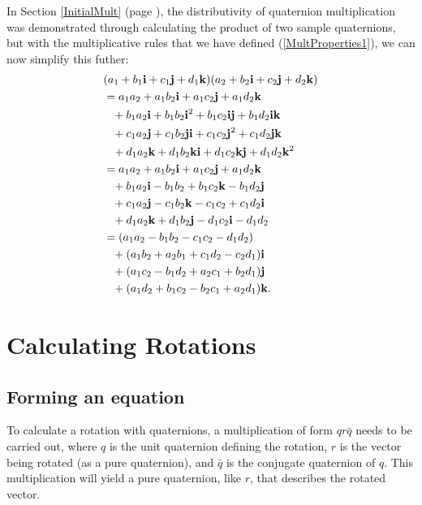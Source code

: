 \documentclass[11pt]{article}
\begin{document}
In Section \ref{InitialMult} (page \pageref{InitialMult}), the distributivity of quaternion multiplication was demonstrated through calculating the product of two sample quaternions, but with the multiplicative rules that we have defined (\ref{MultProperties1}), we can now simplify this futher:
\begin{equation}
    \begin{aligned}
        & (a_1 + b_1\vb{i} + c_1\vb{j} + d_1\vb{k})(a_2 + b_2\vb{i} + c_2\vb{j} + d_2\vb{k}) \\
        & = a_1a_2 + a_1b_2\vb{i} + a_1c_2\vb{j} + a_1d_2\vb{k} \\
        & \phantom{=} + b_1a_2\vb{i} + b_1b_2\vb{i}^2 + b_1c_2\vb{i}\vb{j} + b_1d_2\vb{i}\vb{k} \\
        & \phantom{=} + c_1a_2\vb{j} + c_1b_2\vb{j}\vb{i} + c_1c_2\vb{j}^2 + c_1d_2\vb{j}\vb{k} \\
        & \phantom{=} + d_1a_2\vb{k} + d_1b_2\vb{k}\vb{i} + d_1c_2\vb{k}\vb{j} + d_1d_2\vb{k}^2 \\
        & = a_1a_2 + a_1b_2\vb{i} + a_1c_2\vb{j} + a_1d_2\vb{k} \\
        & \phantom{=} + b_1a_2\vb{i} - b_1b_2 + b_1c_2\vb{k} - b_1d_2\vb{j} \\
        & \phantom{=} + c_1a_2\vb{j} - c_1b_2\vb{k} - c_1c_2 + c_1d_2\vb{i} \\
        & \phantom{=} + d_1a_2\vb{k} + d_1b_2\vb{j} - d_1c_2\vb{i} - d_1d_2  \\
        & = (a_1a_2 - b_1b_2 - c_1c_2 - d_1d_2) \\
        & \phantom{=} + (a_1b_2 + a_2b_1 + c_1d_2 - c_2d_1)\vb{i} \\
        & \phantom{=} + (a_1c_2 - b_1d_2 + a_2c_1 + b_2d_1)\vb{j} \\
        & \phantom{=} + (a_1d_2 + b_1c_2 - b_2c_1 + a_2d_1)\vb{k}.
    \end{aligned}
\end{equation}

\pagebreak
\section{Calculating Rotations}

\subsection{Forming an equation}

To calculate a rotation with quaternions, a multiplication of form $qr\bar{q}$ \cite{DRose} needs to be carried out, where $q$ is the unit quaternion defining the rotation, $r$ is the vector being rotated (as a pure quaternion), and $\bar{q}$ is the conjugate quaternion of $q$. This multiplication will yield a pure quaternion, like $r$, that describes the rotated vector.
\end{document}
